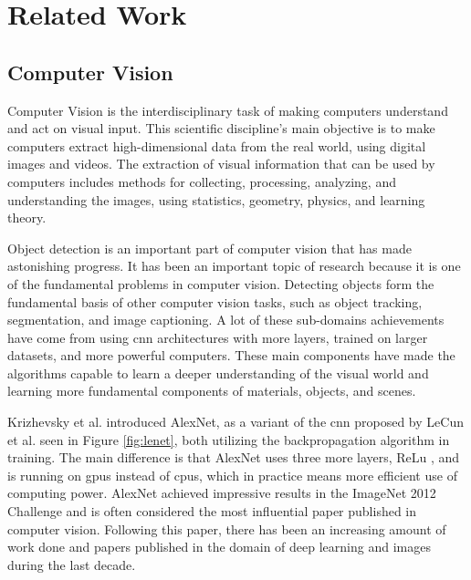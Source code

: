 \label{sec:2_related_work}
\section{Related Work} 

\subsection{Computer Vision}
Computer Vision is the interdisciplinary task of making computers understand and act on visual input. This scientific discipline's main objective is to make computers extract high-dimensional data from the real world, using digital images and videos. The extraction of visual information that can be used by computers includes methods for collecting, processing, analyzing, and understanding the images, using statistics, geometry, physics, and learning theory. 

Object detection is an important part of computer vision that has made astonishing progress. It has been an important topic of research because it is one of the fundamental problems in computer vision. Detecting objects form the fundamental basis of other computer vision tasks, such as object tracking, segmentation, and image captioning. A lot of these sub-domains achievements have come from using \gls{cnn} architectures with more layers, trained on larger datasets, and more powerful computers. These main components have made the algorithms capable to learn a deeper understanding of the visual world and learning more fundamental components of materials, objects, and scenes.  

Krizhevsky et al. introduced AlexNet\cite{krizhevskyImageNetClassificationDeep2017}, as a variant of the \gls{cnn} proposed by LeCun et al.\cite{lecunHandwrittenDigitRecognition1989, lecunGradientbasedLearningApplied1998} seen in Figure \ref{fig:lenet}, both utilizing the backpropagation algorithm \cite{rumelhartLearningRepresentationsBackpropagating1986}
in training. The main difference is that AlexNet uses three more layers, ReLu \cite{fukushimaCognitronSelforganizingMultilayered1975}
, and is running on \glspl{gpu} instead of \glspl{cpu}, which in practice means more efficient use of computing power.
AlexNet achieved impressive results in the ImageNet \cite{dengImageNetLargeScaleHierarchical2009} 2012 Challenge and is often considered the most influential paper published in computer vision. 
Following this paper, there has been an increasing amount of work done and papers published in the domain of deep learning and images during the last decade.

